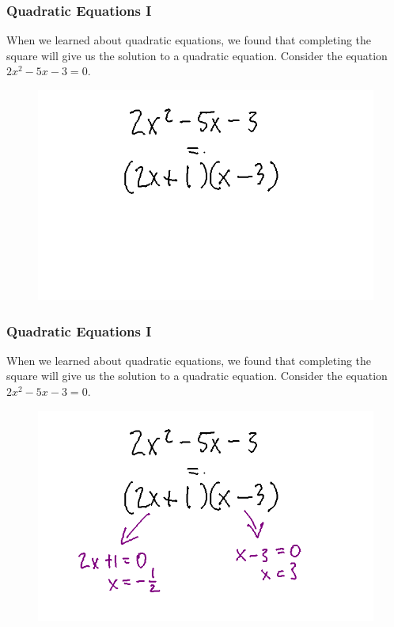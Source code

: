 \documentclass[xcolor=dvipsnames]{beamer}
\begin{document}
\begin{frame}
  \frametitle{Quadratic Equations I}
  When we learned about quadratic equations, we found that completing
  the square will give us the solution to a quadratic equation.
  Consider the equation $2x^{2}-5x-3=0$.
  \begin{figure}[h]
    \includegraphics[scale=.4]{./qfac4.png}
  \end{figure}
\end{frame}

\begin{frame}
  \frametitle{Quadratic Equations I}
  When we learned about quadratic equations, we found that completing
  the square will give us the solution to a quadratic equation.
  Consider the equation $2x^{2}-5x-3=0$.
  \begin{figure}[h]
    \includegraphics[scale=.4]{./qfac5.png}
  \end{figure}
\end{frame}
\end{document}
